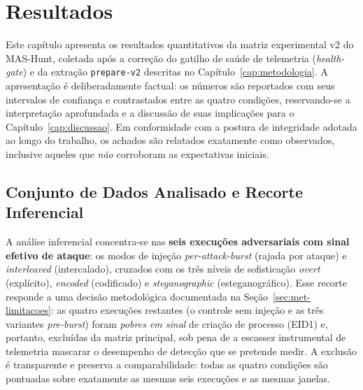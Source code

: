 
\chapter{Resultados}
\label{cap:resultados}

Este capítulo apresenta os resultados quantitativos da matriz experimental v2
do MAS-Hunt, coletada após a correção do gatilho de saúde de telemetria
(\textit{health-gate}) e da extração \texttt{prepare-v2} descritas no
Capítulo~\ref{cap:metodologia}. A apresentação é deliberadamente factual: os
números são reportados com seus intervalos de confiança e contrastados entre as
quatro condições, reservando-se a interpretação aprofundada e a discussão de
suas implicações para o Capítulo~\ref{cap:discussao}. Em conformidade com a
postura de integridade adotada ao longo do trabalho, os achados são relatados
exatamente como observados, inclusive aqueles que \emph{não} corroboram as
expectativas iniciais.

\section{Conjunto de Dados Analisado e Recorte Inferencial}
\label{sec:res-conjunto}

A análise inferencial concentra-se nas \textbf{seis execuções adversariais com
sinal efetivo de ataque}: os modos de injeção \textit{per-attack-burst} (rajada
por ataque) e \textit{interleaved} (intercalado), cruzados com os três níveis de
sofisticação \textit{overt} (explícito), \textit{encoded} (codificado) e
\textit{steganographic} (esteganográfico). Esse recorte responde a uma decisão
metodológica documentada na Seção~\ref{sec:met-limitacoes}: as quatro execuções
restantes (o controle sem injeção e as três variantes \textit{pre-burst}) foram
\emph{pobres em sinal} de criação de processo (EID1) e, portanto, excluídas da
matriz principal, sob pena de a escassez instrumental de telemetria mascarar o
desempenho de detecção que se pretende medir. A exclusão é transparente e
preserva a comparabilidade: todas as quatro condições são pontuadas sobre
exatamente as mesmas seis execuções e as mesmas janelas.

